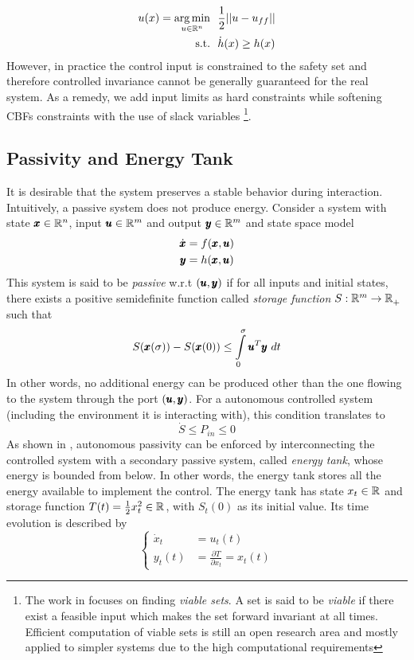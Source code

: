 \begin{align*}
    u(x) =\underset{u \in \mathbb{R}^{n}}{\arg\min} & \ \ \frac{1}{2} ||u - u_{ff}|| \\
     \text{s.t.} & \ \ \dot{h}(x) \geq h(x) 
\end{align*}
However, in practice the control input is constrained to the safety set and therefore controlled invariance cannot be generally guaranteed for the real system. As a remedy, we add input limits as hard constraints while softening CBFs constraints with the use of slack variables \footnote{The work in \cite{gurriet2018towards} focuses on finding \emph{viable sets}. A set is said to be \emph{viable} if there exist a feasible input which makes the set forward invariant at all times. Efficient computation of viable sets is still an open research area and mostly applied to simpler systems due to the high computational requirements}.

\subsection{Passivity and Energy Tank}
It is desirable that the system preserves a stable behavior during interaction. Intuitively, a passive system does not produce energy. Consider a system with state $\pmb{x} \in \mathbb{R}^{n}$, input $\pmb{u} \in \mathbb{R}^{m}$ and output $\pmb{y} \in \mathbb{R}^{m}$ and state space model
\begin{align}
\dot{\pmb{x}} &= f(\pmb{x}, \pmb{u}) \\
\pmb{y} &= h(\pmb{x}, \pmb{u})
\end{align}
This system is said to be \emph{passive} w.r.t $(\pmb{u},\pmb{y})$ if for all inputs and initial states, there exists a positive semidefinite function called \emph{storage function} $S: \mathbb{R}^{m} \rightarrow \mathbb{R}^{}_+$ such that 
\begin{equation}
    S(\pmb{x}(\sigma)) - S(\pmb{x}(0))\leq \int\limits_{0}^{\sigma} \pmb{u}^T \pmb{y}\ dt  
\end{equation}
In other words, no additional energy can be produced other than the one flowing to the system through the port $(\pmb{u},\pmb{y})$.
For a autonomous controlled system (including the environment it is interacting with), this condition translates to 
\begin{equation}
    \dot{S} \leq P_{in} \leq 0
\end{equation}
 As shown in \cite{shahriari2018valve}, autonomous passivity can be enforced by interconnecting the controlled system with a secondary passive system, called \emph{energy tank}, whose energy is bounded from below. In other words, the  energy tank stores all the energy available to implement the control. The energy tank has state $x_t \in \mathbb{R}^{}$ and storage function $T(t) = \frac{1}{2} x_t^2 \in \mathbb{R}^{}$, with $S_t(0)$ as its initial value. Its time evolution is described by
\begin{equation}
\begin{cases}
\dot{x}_t &= u_t(t) \\
y_t(t) &= \frac{\partial T}{\partial x_t} = x_t(t)
\end{cases}
\end{equation}


